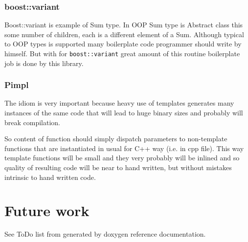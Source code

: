 \documentclass[a4paper]{article}
\begin{document}

\subsubsection{boost::variant}

Boost::variant is example of Sum type.
In OOP Sum type is Abstract class this some number of children, each is a different element of a Sum.
Although typical to OOP types is supported many boilerplate code programmer should write by himself.
But with for \lstinline$boost::variant$ great amount of this routine boilerplate job is done by this library.


\subsubsection{Pimpl}

The idiom is very important because heavy use of templates generates many instances of the same 
code that will lead to huge binary sizes and probably will break compilation. 

So content of function should simply dispatch parameters to non-template functions that are instantiated
in usual for C++ way (i.e. in cpp file). This way template functions will be small and they very probably
will be inlined and so quality of resulting code will be near to hand written, but without mistakes intrinsic
to hand written code.

\section{Future work}

See ToDo list from generated by doxygen reference documentation.
\end{document}
